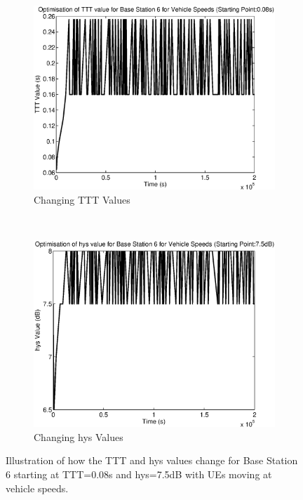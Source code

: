 \begin{figure}[H]
        \centering
        \begin{subfigure}[b]{0.49\textwidth}
                \includegraphics[width=\textwidth]{figures/graphs/vehhighhys/TTT6.eps}
                \caption{Changing TTT Values}
        \end{subfigure}%
        ~ %
        \begin{subfigure}[b]{0.49\textwidth}
                \includegraphics[width=\textwidth]{figures/graphs/vehhighhys/hys6.eps}
                \caption{Changing hys Values}
        \end{subfigure}
        \caption{Illustration of how the TTT and hys values change for Base Station 6 starting at TTT=0.08s and hys=7.5dB with UEs moving at vehicle speeds.}
\end{figure}
